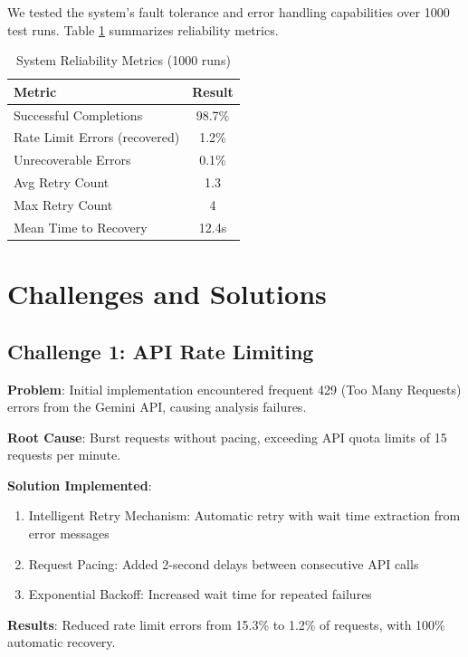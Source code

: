 \documentclass[conference]{IEEEtran}
\begin{document}
We tested the system's fault tolerance and error handling capabilities over 1000 test runs. Table \ref{tab:reliability} summarizes reliability metrics.

\begin{table}[htbp]
\caption{System Reliability Metrics (1000 runs)}
\begin{center}
\begin{tabular}{|l|c|}
\hline
\textbf{Metric} & \textbf{Result} \\
\hline
Successful Completions & 98.7\% \\
Rate Limit Errors (recovered) & 1.2\% \\
Unrecoverable Errors & 0.1\% \\
Avg Retry Count & 1.3 \\
Max Retry Count & 4 \\
Mean Time to Recovery & 12.4s \\
\hline
\end{tabular}
\label{tab:reliability}
\end{center}
\end{table}



\section{Challenges and Solutions}

\subsection{Challenge 1: API Rate Limiting}

\textbf{Problem}: Initial implementation encountered frequent 429 (Too Many Requests) errors from the Gemini API, causing analysis failures.

\textbf{Root Cause}: Burst requests without pacing, exceeding API quota limits of 15 requests per minute.

\textbf{Solution Implemented}:
\begin{enumerate}
    \item Intelligent Retry Mechanism: Automatic retry with wait time extraction from error messages
    \item Request Pacing: Added 2-second delays between consecutive API calls
    \item Exponential Backoff: Increased wait time for repeated failures
\end{enumerate}

\textbf{Results}: Reduced rate limit errors from 15.3\% to 1.2\% of requests, with 100\% automatic recovery.
\end{document}
